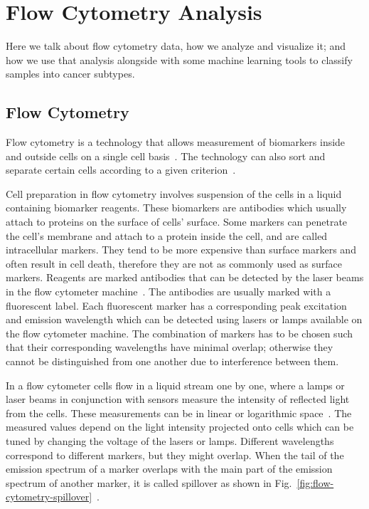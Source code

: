\chapter{Flow Cytometry Analysis}
\label{sec:fcs}

Here we talk about flow cytometry data, how we analyze and visualize it; and how we use that analysis alongside with some machine learning tools to classify samples into cancer subtypes.

\section{Flow Cytometry}
Flow cytometry is a technology that allows measurement of biomarkers inside and outside cells on a single cell basis~\cite{jaroszeski1999fundamentals}. The technology can also sort and separate certain cells according to a given criterion~\cite{flow-cytometry-sorting, jaroszeski1999fundamentals}.

Cell preparation in flow cytometry involves suspension of the cells in a liquid containing biomarker reagents. These biomarkers are antibodies which usually attach to proteins on the surface of cells' surface. Some markers can penetrate the cell's membrane and attach to a protein inside the cell, and are called intracellular markers. They tend to be more expensive than surface markers and often result in cell death, therefore they are not as commonly used as surface markers. Reagents are marked antibodies that can be detected by the laser beams in the flow cytometer machine~\cite{flow-cytometry-cell-preparation}. The antibodies are usually marked with a fluorescent label. Each fluorescent marker has a corresponding peak excitation and emission wavelength which can be detected using lasers or lamps available on the flow cytometer machine. The combination of markers has to be chosen such that their corresponding wavelengths have minimal overlap; otherwise they cannot be distinguished from one another due to interference between them.

In a flow cytometer cells flow in a liquid stream one by one, where a lamps or laser beams in conjunction with sensors measure the intensity of reflected light from the cells. These measurements can be in linear or logarithmic space~\cite{practical-flow-cytometry-book}. The measured values depend on the light intensity projected onto cells which can be tuned by changing the voltage of the lasers or lamps. Different wavelengths correspond to different markers, but they might overlap. When the tail of the emission spectrum of a marker overlaps with the main part of the emission spectrum of another marker, it is called spillover as shown in Fig.~\ref{fig:flow-cytometry-spillover}~\cite{flow-cytometry-compensation}.

